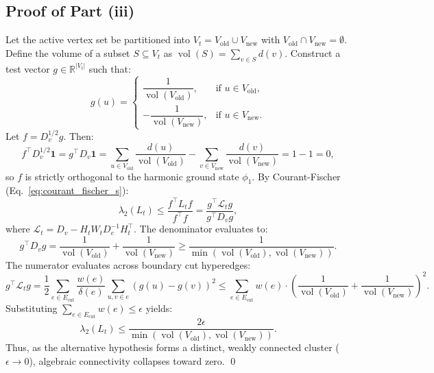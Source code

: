 \documentclass[11pt]{article}
\DeclareMathOperator{\vol}{vol}
\newcommand{\R}{\mathbb{R}}
\begin{document}
\subsection{Proof of Part (iii)}
Let the active vertex set be partitioned into $V_t = V_{\text{old}} \cup V_{\text{new}}$ with $V_{\text{old}} \cap V_{\text{new}} = \emptyset$.
Define the volume of a subset $S \subseteq V_t$ as $\vol(S) = \sum_{v \in S} d(v)$.
Construct a test vector $g \in \R^{|V_t|}$ such that:
\begin{equation}
  g(u) = \begin{cases}
    \dfrac{1}{\vol(V_{\text{old}})}, & \text{if } u \in V_{\text{old}}, \\[8pt]
    -\dfrac{1}{\vol(V_{\text{new}})}, & \text{if } u \in V_{\text{new}}.
  \end{cases}
\end{equation}
Let $f = D_v^{1/2} g$. Then:
\begin{equation}
  f^\top D_v^{1/2} \mathbf{1} = g^\top D_v \mathbf{1} = \sum_{u \in V_{\text{old}}} \frac{d(u)}{\vol(V_{\text{old}})} - \sum_{v \in V_{\text{new}}} \frac{d(v)}{\vol(V_{\text{new}})} = 1 - 1 = 0,
\end{equation}
so $f$ is strictly orthogonal to the harmonic ground state $\phi_1$. By Courant-Fischer (Eq.~\eqref{eq:courant_fischer_s}):
\begin{equation}
  \lambda_2(L_t) \le \frac{f^\top L_t f}{f^\top f} = \frac{g^\top \mathcal{L}_t g}{g^\top D_v g},
\end{equation}
where $\mathcal{L}_t = D_v - H_t W_t D_e^{-1} H_t^\top$.
The denominator evaluates to:
\begin{equation}
  g^\top D_v g = \frac{1}{\vol(V_{\text{old}})} + \frac{1}{\vol(V_{\text{new}})} \ge \frac{1}{\min(\vol(V_{\text{old}}), \vol(V_{\text{new}}))}.
\end{equation}
The numerator evaluates across boundary cut hyperedges:
\begin{equation}
  g^\top \mathcal{L}_t g = \frac{1}{2} \sum_{e \in E_{\text{cut}}} \frac{w(e)}{\delta(e)} \sum_{u, v \in e} (g(u) - g(v))^2 \le \sum_{e \in E_{\text{cut}}} w(e) \cdot \left( \frac{1}{\vol(V_{\text{old}})} + \frac{1}{\vol(V_{\text{new}})} \right)^2.
\end{equation}
Substituting $\sum_{e \in E_{\text{cut}}} w(e) \le \epsilon$ yields:
\begin{equation}
  \lambda_2(L_t) \le \frac{2 \epsilon}{\min(\vol(V_{\text{old}}), \vol(V_{\text{new}}))}.
\end{equation}
Thus, as the alternative hypothesis forms a distinct, weakly connected cluster ($\epsilon \to 0$), algebraic connectivity collapses toward zero. \qed
\end{document}
